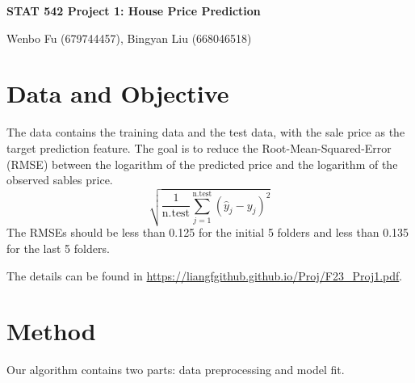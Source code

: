 \documentclass[12pt]{article}
\theoremstyle{plain}
\renewcommand{\title}[1]{\vbox{\center\bf{\Large{#1}}}\vspace{5mm}}
\renewcommand{\author}[1]{\vbox{\center#1}\vspace{5mm}}
\renewcommand{\hat}{\widehat}
\begin{document}
\begin{center}
\title{STAT 542 Project 1: House Price Prediction}

\author{Wenbo Fu (679744457), Bingyan Liu (668046518)}

\end{center}
  

\baselineskip=17.63pt 


\section{Data and Objective}

The data contains the training data and the test data, with the sale price as the target prediction feature. The goal is to reduce the Root-Mean-Squared-Error (RMSE) between the logarithm of the predicted price and the logarithm of the observed sables price.
\begin{equation}
\sqrt{\frac{1}{\text{n.test}}\sum_{j=1}^{\text{n.test}}(\hat{y}_j-y_j)^2}
\end{equation}
The RMSEs should be less than 0.125 for the initial 5 folders and less than 0.135 for the last 5 folders.

The details can be found in \url{https://liangfgithub.github.io/Proj/F23_Proj1.pdf}. 

\section{Method}
Our algorithm contains two parts: data preprocessing and model fit. 
\end{document}
